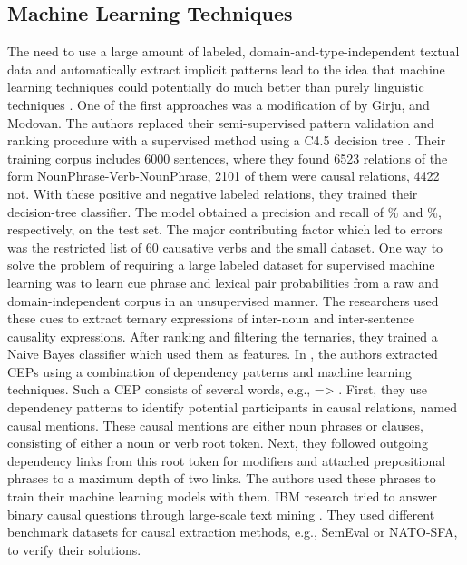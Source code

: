 \subsection{Machine Learning Techniques}\label{subsec:machine-learning-techniques}
The need to use a large amount of labeled, domain-and-type-independent textual data and automatically extract implicit patterns lead to the idea that machine learning techniques could potentially do much better than purely linguistic techniques \cite{asghar2016automatic}.
One of the first approaches was a modification of \cite{girju2002text} by Girju, and Modovan.
The authors replaced their semi-supervised pattern validation and ranking procedure with a supervised method using a C4.5 decision tree \cite{girju2003automatic}.
Their training corpus includes 6000 sentences, where they found 6523 relations of the form NounPhrase-Verb-NounPhrase, 2101 of them were causal relations, 4422 not.
With these positive and negative labeled relations, they trained their decision-tree classifier.
The model obtained a precision and recall of \% and \%, respectively, on the test set.
The major contributing factor which led to errors was the restricted list of 60 causative verbs and the small dataset.
One way to solve the problem of requiring a large labeled dataset for supervised machine learning was to learn cue phrase and lexical pair probabilities from a raw and domain-independent corpus in an unsupervised manner.
The researchers \cite{marcu2002unsupervised, chang2004causal} used these cues to extract ternary expressions of inter-noun and inter-sentence causality expressions.
After ranking and filtering the ternaries, they trained a Naive Bayes classifier which used them as features.
In \cite{sharp2016creating}, the authors extracted \ac{CEP}s using a combination of dependency patterns and machine learning techniques.
Such a \ac{CEP} consists of several words, e.g.,  => .
First, they use dependency patterns to identify potential participants in causal relations, named causal mentions.
These causal mentions are either noun phrases or clauses, consisting of either a noun or verb root token.
Next, they followed outgoing dependency links from this root token for modifiers and attached prepositional phrases to a maximum depth of two links.
The authors used these phrases to train their machine learning models with them.
IBM research tried to answer binary causal questions through large-scale text mining \cite{Hassanzadeh19}.
They used different benchmark datasets for causal extraction methods, e.g., SemEval or \ac{NATO-SFA}, to verify their solutions.
